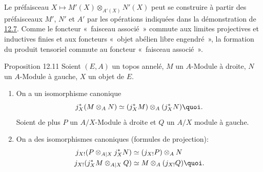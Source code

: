 \documentclass[10pt]{../fichiers-configuration-latex/smfart}
\begin{document}
Le préfaisceau $X\mapsto M'(X)\otimes_{A'(X)}N'(X)$ peut se
construire à partir des préfaisceaux $M'$, $N'$ et $A'$ par les
opérations indiquées dans la démonstration de \hyperref[IV.prop12.7]{12.7}.
Comme le foncteur « faisceau associé » commute aux limites
projectives et inductives finies et aux foncteurs « objet abélien
libre engendré », la formation du produit tensoriel commute au
foncteur « faisceau associé ».

\begin{enonce*}{Proposition 12.11}
Soient $(E,A)$ un topos annelé, $M$ un $A$-Module à droite, $N$ un
$A$-Module à gauche, $X$ un objet de $E$.
\begin{enumerate}
\renewcommand{\theenumi}{\alph{enumi}}
\renewcommand{\labelenumi}{\theenumi)}
\item On a un isomorphisme canonique
$$
j^{\ast}_X(M\otimes_A N)\simeq (j^{\ast}_XM)\otimes_A
(j^{\ast}_XN){\quoi}.
$$
Soient de plus $P$ un $A/X$-Module à droite et $Q$ un $A/X$ module à
gauche.

\item On a des isomorphismes canoniques (formules de projection):
\begin{align*}
j_{X!}(P\otimes_{A| X} j^{\ast}_XN) &\simeq (j_{X!}P)\otimes_A N\\
j_{X!}(j^{\ast}_XM\otimes_{A| X}Q) &\simeq M\otimes_A
(j_{X!}Q){\quoi}.
\end{align*}
\end{enumerate}
\end{enonce*}
\end{document}
